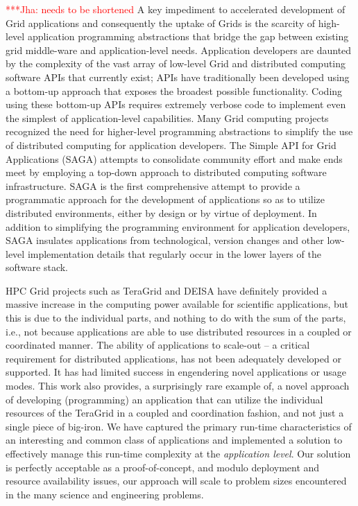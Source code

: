 \documentclass[conference,final]{IEEEtran}
\newcommand{\jhanote}[1]{ {\textcolor{red} { ***Jha: #1 }}}
\newcommand{\jhanote}[1]{}
\begin{document}
\jhanote{needs to be shortened} A key impediment to accelerated
development of Grid applications and consequently the uptake of Grids
is the scarcity of high-level application programming abstractions
that bridge the gap between existing grid middle-ware and
application-level needs.  Application developers are daunted by the
complexity of the vast array of low-level Grid and distributed
computing software APIs that currently exist; APIs have traditionally
been developed using a bottom-up approach that exposes the broadest
possible functionality.  Coding using these bottom-up APIs requires
extremely verbose code to implement even the simplest of
application-level capabilities.  Many Grid computing
projects~\cite{gat, cog, realitygrid} recognized the need for
higher-level programming abstractions to simplify the use of
distributed computing for application developers.  The Simple API for
Grid Applications (SAGA) attempts to consolidate community effort and
make ends meet by employing a top-down approach to distributed
computing software infrastructure.  SAGA is the first comprehensive
attempt to provide a programmatic approach for the development of
applications so as to utilize distributed environments, either by
design or by virtue of deployment.  In addition to simplifying the
programming environment for application developers, SAGA insulates
applications from technological, version changes and other low-level
implementation details that regularly occur in the lower layers of the
software stack.

HPC Grid projects such as TeraGrid and DEISA have definitely provided
a massive increase in the computing power available for scientific
applications, but this is due to the individual parts, and nothing to
do with the sum of the parts, i.e., not because applications are able
to use distributed resources in a coupled or coordinated manner. The
ability of applications to scale-out -- a critical requirement for
distributed applications, has not been adequately developed or
supported. It has had limited success in engendering novel
applications or usage modes.  This work also provides, a surprisingly
rare example of, a novel approach of developing (programming) an
application that can utilize the individual resources of the TeraGrid
in a coupled and coordination fashion, and not just a single piece of
big-iron.  We have captured the primary run-time characteristics of an
interesting and common class of applications and implemented a
solution to effectively manage this run-time complexity at the {\it
  application level}.  Our solution is perfectly acceptable as a
proof-of-concept, and modulo deployment and resource availability
issues, our approach will scale to problem sizes encountered in the
many science and engineering problems.
\end{document}
